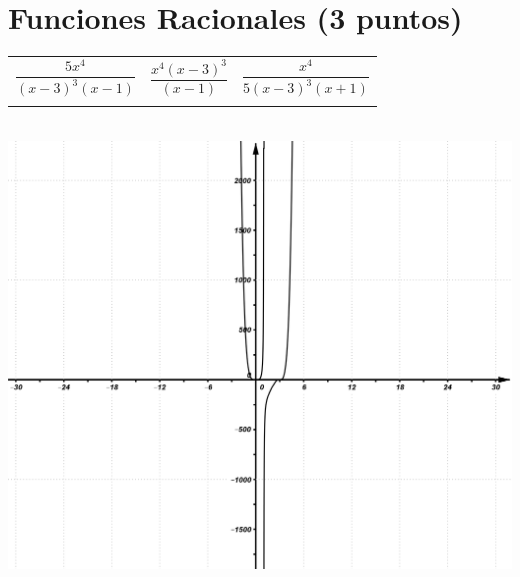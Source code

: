 \documentclass[a4paper,11pt,spanish,sans]{exam}
\newcommand{\Ts}{\rule{0pt}{2.8ex}}       %
\newcommand{\Bs}{\rule[-1.5ex]{0pt}{0pt}} %
\begin{document}
\section{Funciones Racionales (3 puntos)}
	\begin{minipage}{0.5\textwidth}
		\centering
		\label{mc1}
		\begin{tabular}{|c|c|c|}
			\hline
				$\dfrac{5x^4}{(x-3)^3(x-1)}$  & $\dfrac{x^4(x-3)^3}{(x-1)}$ & $\dfrac{x^4}{5(x-3)^3(x+1)}$ \Ts \Bs   \\
			&   &      \\ \hline
		\end{tabular}\\
		\centering
		\includegraphics[width= 0.95\linewidth]{2dadic.png}
	\end{minipage}
\end{document}

